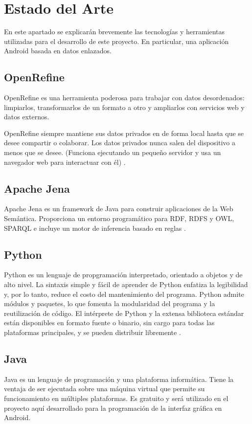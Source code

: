 \chapter{Estado del Arte}

En este apartado se explicarán brevemente las tecnologías y herramientas utilizadas para el desarrollo de este proyecto. En particular, una aplicación Android basada en datos enlazados.


\section{OpenRefine}
OpenRefine es una herramienta poderosa para trabajar con datos desordenados: limpiarlos, transformarlos de un formato a otro y ampliarlos con servicios web y datos externos.

OpenRefine siempre mantiene sus datos privados en de forma local hasta que se desee compartir o colaborar. Los datos privados nunca salen del dispositivo a menos que se desee. (Funciona ejecutando un pequeño servidor y usa un navegador web para interactuar con él) \cite{pagPrinc_OpenRefine}.

\section{Apache Jena}
Apache Jena es un framework de Java para construir aplicaciones de la Web Semántica. Proporciona un entorno programático para RDF, RDFS y OWL, SPARQL e incluye un motor de inferencia basado en reglas \cite{JenaDescripcion}.

\section{Python}
Python es un lenguaje de propgramación interpretado, orientado a objetos y de alto nivel.
La sintaxis simple y fácil de aprender de Python enfatiza la legibilidad y, por lo tanto, reduce el costo del mantenimiento del programa. Python admite módulos y paquetes, lo que fomenta la modularidad del programa y la reutilización de código. El intérprete de Python y la extensa biblioteca estándar están disponibles en formato fuente o binario, sin cargo para todas las plataformas principales, y se pueden distribuir libremente \cite{pythonDescripcion}.


\section{Java}
Java es un lenguaje de programación y una plataforma informática. Tiene la ventaja de ser ejecutada sobre una máquina virtual que permite su funcionamiento en múltiples plataformas\cite{descripcionJava}. Es gratuito y será utilizado en el proyecto aquí desarrollado para la programación de la interfaz gráfica en Android.


